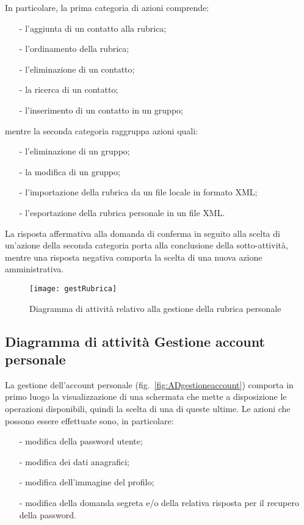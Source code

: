 In particolare, la prima categoria di azioni comprende:
\begin{itemize}[noitemsep,nolistsep]
  \item[-] l'aggiunta di un contatto alla rubrica;
  \item[-] l'ordinamento della rubrica;
  \item[-] l'eliminazione di un contatto;
  \item[-] la ricerca di un contatto;
  \item[-] l'inserimento di un contatto in un gruppo;
\end{itemize}
mentre la seconda categoria raggruppa azioni quali:
\begin{itemize}[noitemsep,nolistsep]
  \item[-] l'eliminazione di un gruppo;
  \item[-] la modifica di un gruppo;
  \item[-] l'importazione della rubrica da un file locale in formato XML;
  \item[-] l'esportazione della rubrica personale in un file XML.
\end{itemize}

La risposta affermativa alla domanda di conferma in seguito alla scelta di un'azione della seconda categoria porta alla conclusione della sotto-attività, mentre una risposta negativa comporta la scelta di una nuova azione amministrativa.

\begin{figure}[H]
  \centering
  \texttt{[image: gestRubrica]}
  \caption{Diagramma di attività relativo alla gestione della rubrica personale}\label{fig:ADgestionerubrica}
\end{figure}

\subsection{Diagramma di attività Gestione account personale}
La gestione dell'account personale (fig.~\vref{fig:ADgestioneaccount}) comporta in primo luogo la visualizzazione di una schermata che mette a disposizione le operazioni disponibili, quindi la scelta di una di queste ultime. Le azioni che possono essere effettuate sono, in particolare:
\begin{itemize}[noitemsep,nolistsep]
  \item[-] modifica della password utente;
  \item[-] modifica dei dati anagrafici;
  \item[-] modifica dell'immagine del profilo;
  \item[-] modifica della domanda segreta e/o della relativa risposta per il recupero della password.
\end{itemize}

